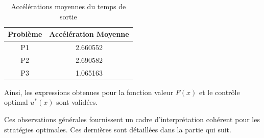 \begin{itemize}
    \begin{table}[htb]
        \centering
        \caption{Accélérations moyennes du temps de sortie}\label{tab:acceleration_results}
        \renewcommand{\arraystretch}{1.1}
        \begin{tabular}{||c|c||}
        \hline
        Problème & Accélération Moyenne \\\hline\hline
        P1 & 2.660552 \\
        P2 & 2.690582 \\
        P3 & 1.065163 \\\hline
        \end{tabular}
    \end{table}
\end{itemize}\FloatBarrier Ainsi, les expressions obtenues pour la fonction valeur $F(x)$ et le contrôle optimal $u^*(x)$ sont validées.

Ces observations générales fournissent un cadre d'interprétation cohérent pour les stratégies optimales. Ces dernières sont détaillées dans la partie qui suit.
